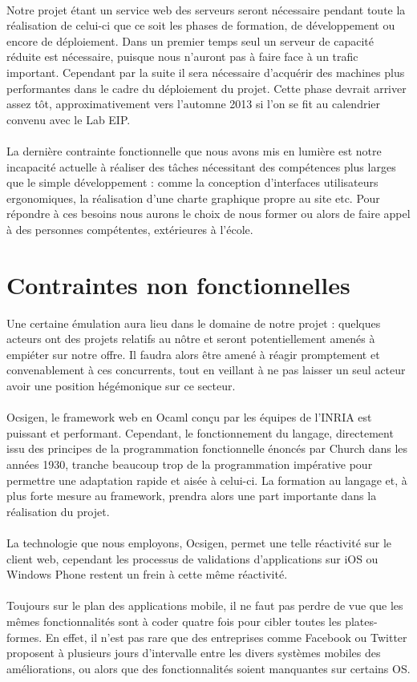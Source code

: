 \documentclass{life-fr}
\begin{document}
\\
Notre projet étant un service web des serveurs seront nécessaire pendant toute la réalisation de celui-ci que ce soit les phases de formation, de développement ou encore de déploiement. Dans un premier temps seul un serveur de capacité réduite est nécessaire, puisque nous n'auront pas à faire face à un trafic important. Cependant par la suite il sera nécessaire d'acquérir des machines plus performantes dans le cadre du déploiement du projet. Cette phase devrait arriver assez tôt, approximativement vers l'automne 2013 si l'on se fit au calendrier convenu avec le Lab EIP.\\
\\
La dernière contrainte fonctionnelle que nous avons mis en lumière est notre incapacité actuelle à réaliser des tâches nécessitant des compétences plus larges que le simple développement : comme la conception d'interfaces utilisateurs ergonomiques, la réalisation d'une charte graphique propre au site etc. Pour répondre à ces besoins nous aurons le choix de nous former ou alors de faire appel à des personnes compétentes, extérieures à l'école.

\section{Contraintes non fonctionnelles}

Une certaine émulation aura lieu dans le domaine de notre projet : quelques acteurs ont des projets relatifs au nôtre et seront potentiellement amenés à
empiéter sur notre offre. Il faudra alors être amené à réagir promptement et convenablement à ces concurrents, tout en veillant à ne pas laisser un seul
acteur avoir une position hégémonique sur ce secteur.\\
\\
Ocsigen, le framework web en Ocaml conçu par les équipes de l'INRIA est puissant et performant. Cependant, le fonctionnement du langage, directement
issu des principes de la programmation fonctionnelle énoncés par Church dans les années 1930, tranche beaucoup trop de la programmation impérative pour
permettre une adaptation rapide et aisée à celui-ci. La formation au langage et, à plus forte mesure au framework, prendra alors une part importante dans
la réalisation du projet. \\
\\
La technologie que nous employons, Ocsigen, permet une telle réactivité sur le client web, cependant les processus de validations d'applications sur iOS
ou Windows Phone restent un frein à cette même réactivité. \\
\\
Toujours sur le plan des applications mobile, il ne faut pas perdre de vue que les mêmes fonctionnalités sont à coder quatre fois pour cibler toutes les
plates-formes. En effet, il n'est pas rare que des entreprises comme Facebook ou Twitter proposent à plusieurs jours d'intervalle entre les divers systèmes
mobiles des améliorations, ou alors que des fonctionnalités soient manquantes sur certains OS.
\end{document}
